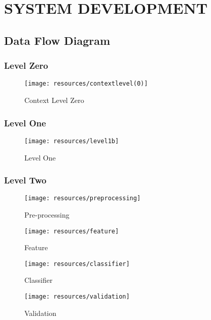\newpage
\section{SYSTEM DEVELOPMENT}
\subsection{Data Flow Diagram}
\subsubsection{Level Zero}
\begin{figure}[h]
        \centering
        \texttt{[image: resources/contextlevel(0)]}
        \caption{Context Level Zero}
        \label{fig:contextlevel}
\end{figure}
\subsubsection{Level One}
\begin{figure}[h]
        \centering
        \texttt{[image: resources/level1b]}
        \caption{Level One}
        \label{fig:level1b}
\end{figure}
\newpage
\subsubsection{Level Two}
\vspace{20mm}
\begin{figure}[h]
        \centering
        \texttt{[image: resources/preprocessing]}
        \caption{Pre-processing}
        \label{fig:pre-processing}
\end{figure}
\vspace{20mm}
\begin{figure}[h]
        \centering
        \texttt{[image: resources/feature]}
        \caption{Feature}
        \label{fig:feature}
\end{figure}
\vspace{90mm}
\begin{figure}[h]
        \centering
        \texttt{[image: resources/classifier]}
        \caption{Classifier}
        \label{fig:classifier}
\end{figure}
\vspace{50mm}
\begin{figure}[h]
        \centering
        \texttt{[image: resources/validation]}
        \caption{Validation}
        \label{fig:validation}
\end{figure}
\newpage
\newpage
